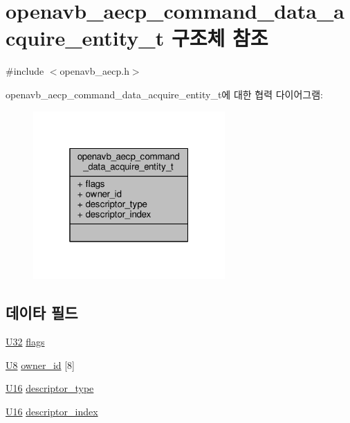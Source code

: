 \hypertarget{structopenavb__aecp__command__data__acquire__entity__t}{}\section{openavb\+\_\+aecp\+\_\+command\+\_\+data\+\_\+acquire\+\_\+entity\+\_\+t 구조체 참조}
\label{structopenavb__aecp__command__data__acquire__entity__t}


{\ttfamily \#include $<$openavb\+\_\+aecp.\+h$>$}



openavb\+\_\+aecp\+\_\+command\+\_\+data\+\_\+acquire\+\_\+entity\+\_\+t에 대한 협력 다이어그램\+:
\nopagebreak
\begin{figure}[H]
\begin{center}
\leavevmode
\includegraphics[width=208pt]{structopenavb__aecp__command__data__acquire__entity__t__coll__graph}
\end{center}
\end{figure}
\subsection*{데이타 필드}
\begin{DoxyCompactItemize}
\item 
\hyperlink{openavb__types__base__pub_8h_a696390429f2f3b644bde8d0322a24124}{U32} \hyperlink{structopenavb__aecp__command__data__acquire__entity__t_a66936d9b1b8185ff2dd6aaee07c22a2b}{flags}
\item 
\hyperlink{openavb__types__base__pub_8h_aa63ef7b996d5487ce35a5a66601f3e73}{U8} \hyperlink{structopenavb__aecp__command__data__acquire__entity__t_ad571ead988eae05d924b81ef361c6047}{owner\+\_\+id} \mbox{[}8\mbox{]}
\item 
\hyperlink{openavb__types__base__pub_8h_a0a0a322d5fa4a546d293a77ba8b4a71f}{U16} \hyperlink{structopenavb__aecp__command__data__acquire__entity__t_a1e231d7874aada5925b29affc76782cc}{descriptor\+\_\+type}
\item 
\hyperlink{openavb__types__base__pub_8h_a0a0a322d5fa4a546d293a77ba8b4a71f}{U16} \hyperlink{structopenavb__aecp__command__data__acquire__entity__t_ab26fb363c24b9a2a4391f9171c981b08}{descriptor\+\_\+index}
\end{DoxyCompactItemize}


